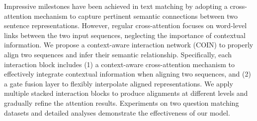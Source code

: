 Impressive milestones have been achieved in text matching by adopting a cross-attention mechanism to capture pertinent semantic connections between two sentence representations. However, regular cross-attention focuses on word-level links between the two input sequences, neglecting the importance of contextual information. We propose a context-aware interaction network (COIN) to properly align two sequences and infer their semantic relationship. Specifically, each interaction block includes (1) a context-aware cross-attention mechanism to effectively integrate contextual information when aligning two sequences, and (2) a gate fusion layer to flexibly interpolate aligned representations. We apply multiple stacked interaction blocks to produce alignments at different levels and gradually refine the attention results. Experiments on two question matching datasets and detailed analyses demonstrate the effectiveness of our model.
